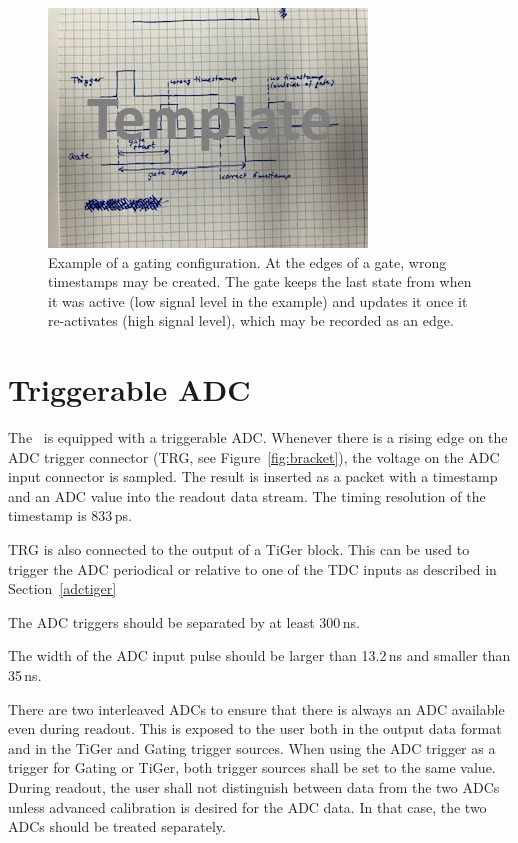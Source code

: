 {    \begin{figure}[tbh]
        \centering \includegraphics[width=0.6\linewidth]{figures/template.png}
        \caption{Example of a gating configuration. 
            At the edges of a gate, wrong timestamps may be created.
            The gate keeps the last state from when it was active (low signal
            level in the example) and updates it once it re-activates 
            (high signal level), which may be recorded as an edge.}
        \label{fig:gatingcaviat}
    \end{figure}

        
    \section{Triggerable ADC}
    \label{adc}
    The \deviceName\ is equipped with a triggerable ADC.  Whenever there is a
    rising edge on the ADC trigger connector (TRG, see
    Figure~\ref{fig:bracket}), the voltage on the ADC input connector is
    sampled. The result is inserted as a packet with a timestamp and an ADC
    value into the readout data stream. The timing resolution of the timestamp
	is 833\,ps.

    TRG is also connected to the output of a TiGer block.  This
    can be used  to trigger the ADC periodical or relative to one of the TDC
    inputs as described in Section~\ref{adctiger}

    The ADC triggers should be separated by at least 300\,ns.

    The width of the ADC input pulse should be larger than 13.2\,ns and
    smaller than 35\,ns.

    There are two interleaved ADCs to ensure that there is always an ADC
    available even during readout. This is exposed to the user both in the
    output data format and in the TiGer and Gating trigger sources.  When
    using the ADC trigger as a trigger for Gating or TiGer, both trigger
    sources shall be set to the same value.  During readout, the user shall
    not distinguish between data from the two ADCs unless advanced calibration
    is desired for the ADC data. In that case, the two ADCs should be treated
    separately.   
}{}